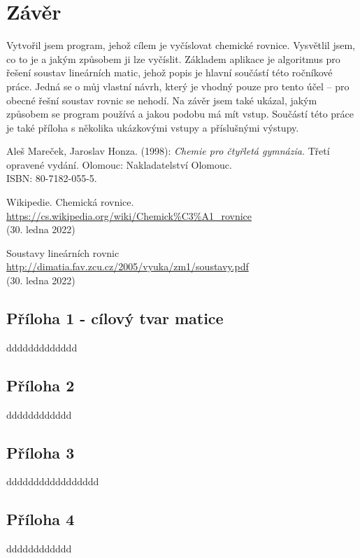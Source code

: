 \documentclass[12pt,a4paper]{report}
\begin{document}
\chapter{Závěr}
Vytvořil jsem program, jehož cílem je vyčíslovat chemické rovnice. Vysvětlil jsem, co to je a jakým způsobem ji lze vyčíslit. Základem aplikace je algoritmus pro řešení soustav lineárních matic, jehož popis je hlavní součástí této ročníkové práce. Jedná se o můj vlastní návrh, který je vhodný pouze pro tento účel -- pro obecné řešní soustav rovnic se nehodí. Na závěr jsem také ukázal, jakým způsobem se program používá a jakou podobu má mít vstup. Součástí této práce je také příloha s několika ukázkovými vstupy a příslušnými výstupy.
\begin{thebibliography}{99}

Aleš Mareček, Jaroslav Honza. (1998): \textit{Chemie pro čtyřletá gymnázia.} Třetí opravené vydání. Olomouc: Nakladatelství Olomouc.\\
ISBN: 80-7182-055-5.

Wikipedie. Chemická rovnice.\\
\url{https://cs.wikipedia.org/wiki/Chemick\%C3\%A1_rovnice}\\
(30. ledna 2022)

Soustavy lineárních rovnic\\
\url{http://dimatia.fav.zcu.cz/2005/vyuka/zm1/soustavy.pdf}\\
(30. ledna 2022)
\end{thebibliography}

\section*{Příloha 1 - cílový tvar matice}
\label{P1}
ddddddddddddd
\pagebreak

\section*{Příloha 2}
\label{P2}
dddddddddddd
\pagebreak

\section*{Příloha 3}
\label{P3}
ddddddddddddddddd
\pagebreak

\section*{Příloha 4}
\label{P4}
dddddddddddd
\pagebreak


\openright
\end{document}

